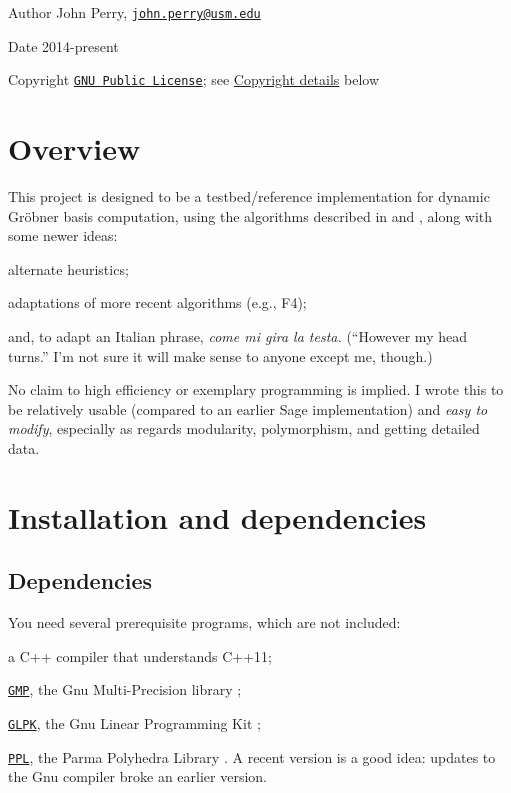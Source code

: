 \begin{DoxyAuthor}{Author}
John Perry, \href{mailto:john.perry@usm.edu}{\tt john.\+perry@usm.\+edu} 
\end{DoxyAuthor}
\begin{DoxyDate}{Date}
2014-\/present 
\end{DoxyDate}
\begin{DoxyCopyright}{Copyright}
\href{../../COPYING.txt}{\tt G\+NU Public License}; see \hyperlink{index_Copyright}{Copyright details} below
\end{DoxyCopyright}
\hypertarget{index_Overview}{}\section{Overview}\label{index_Overview}
This project is designed to be a testbed/reference implementation for dynamic Gr\"{o}bner basis computation, using the algorithms described in \cite{CaboaraDynAlg} and \cite{CaboaraPerry}, along with some newer ideas\+:


\begin{DoxyItemize}
\item alternate heuristics;
\item adaptations of more recent algorithms (e.\+g., F4);
\item and, to adapt an Italian phrase, {\itshape come mi gira la testa.} (``However my head turns.'' I'm not sure it will make sense to anyone except me, though.)
\end{DoxyItemize}

No claim to high efficiency or exemplary programming is implied. I wrote this to be relatively usable (compared to an earlier Sage implementation) and {\itshape easy to modify}, especially as regards modularity, polymorphism, and getting detailed data.\hypertarget{index_Install}{}\section{Installation and dependencies}\label{index_Install}
\hypertarget{index_Dependencies}{}\subsection{Dependencies}\label{index_Dependencies}
You need several prerequisite programs, which are not included\+:
\begin{DoxyItemize}
\item a C++ compiler that understands C++11;
\item \href{https://gmplib.org/}{\tt G\+MP}, the Gnu Multi-\/\+Precision library \cite{gmp};
\item \href{https://www.gnu.org/software/glpk/}{\tt G\+L\+PK}, the Gnu Linear Programming Kit \cite{glpk};
\item \href{http://bugseng.com/products/ppl}{\tt P\+PL}, the Parma Polyhedra Library \cite{BagnaraHZ08SCP}. A recent version is a good idea\+: updates to the Gnu compiler broke an earlier version.
\end{DoxyItemize}

